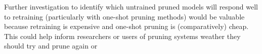 \documentclass[../Dissertation.tex]{subfiles}
\begin{document}
Further investigation to identify which untrained pruned models will respond well to retraining (particularly with one-shot pruning methods) would be valuable because retraining is expensive and one-shot pruning is (comparatively) cheap.
This could help inform researchers or users of pruning systems weather they should try and prune again or 
\end{document}
